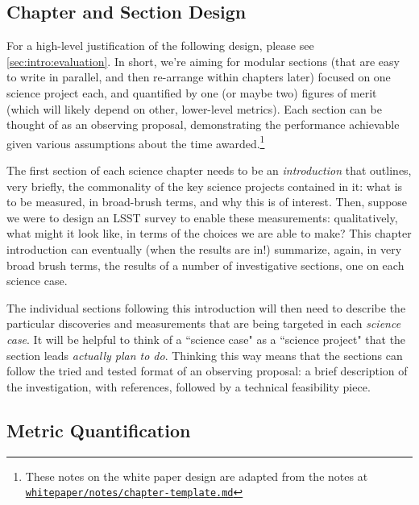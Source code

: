 \subsection{Chapter and Section Design}

For a high-level justification of the following design, please see
\autoref{sec:intro:evaluation}. In short, we're aiming for modular
sections (that are easy to write in parallel, and then re-arrange
within chapters later) focused on one science project each, and
quantified by one (or maybe two) figures of merit (which will likely
depend on other, lower-level metrics). Each section can be thought of
as an observing proposal, demonstrating the performance achievable
given various assumptions about the time awarded.\footnote{These notes
on the white paper design are adapted from the notes at
\href{https://github.com/LSSTScienceCollaborations/ObservingStrategy/blob/master/whitepaper/notes/chapter-template.md}{\texttt{whitepaper/notes/chapter-template.md}}}


The first section of each science chapter needs to be an \textit{introduction}
that outlines, very briefly, the commonality of the key science projects
contained in it:  what is to be measured, in broad-brush terms, and
why this is of interest. Then, suppose we were to design an LSST
survey to enable these measurements: qualitatively, what might it look
like, in terms of the choices we are able to make? This chapter
introduction can eventually (when the results are in!) summarize,
again, in very broad brush terms, the results of a number of
investigative sections, one on each science case.

The individual sections following this introduction will then need to
describe the particular discoveries and measurements that are being
targeted in each \textit{science case}. It will be helpful to think of a
``science case" as a ``science project" that the section leads {\it
actually plan to do}. Thinking this way means that the sections can
follow the tried and tested format of an observing proposal: a brief
description of the investigation, with references, followed by a
technical feasibility piece.


\subsection{Metric Quantification}


